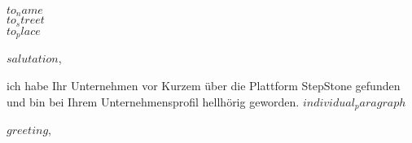\documentclass[
  fontsize=11pt,
  paper=a4,
  parskip=half,
  enlargefirstpage=on,    %
  fromalign=right,        %
  fromrule=aftername,     %
  addrfield=on,           %
  backaddress=on,         %
  subject=beforeopening,  %
  locfield=narrow,        %
  foldmarks=on,           %
]{scrlttr2}
\begin{document}
  \begin{letter}{$to_name$ \\$to_street$\\$to_place$}
    \opening{$salutation$,}
        ich habe Ihr Unternehmen vor Kurzem über die Plattform StepStone gefunden und bin bei Ihrem Unternehmensprofil hellhörig geworden.
        $individual_paragraph$
    \closing{$greeting$,}
  \end{letter}
\end{document}
